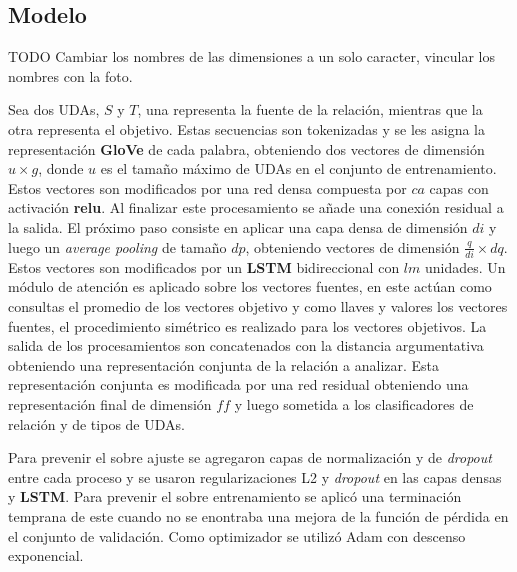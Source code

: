 \subsection{Modelo}

TODO Cambiar los nombres de las dimensiones a un solo caracter, vincular los nombres con la foto.

Sea dos UDAs, $S$ y $T$, una representa la fuente de la relación, mientras que la otra representa
el objetivo. Estas secuencias son tokenizadas y se les asigna la representación \textbf{GloVe} de cada palabra, obteniendo
dos vectores de dimensión $u \times g$, donde $u$ es el tamaño máximo de UDAs en el conjunto de entrenamiento.
Estos vectores son modificados por una red densa compuesta por $ca$ capas con activación \textbf{relu}. 
Al finalizar este procesamiento se añade una conexión residual
a la salida. El próximo paso consiste en aplicar una capa densa de dimensión $di$ y luego un \emph{average pooling}
de tamaño $dp$, obteniendo vectores de dimensión $\frac{q}{di} \times dq$. 
Estos vectores son modificados por un \textbf{LSTM} bidireccional con $lm$ unidades. Un módulo de atención es aplicado 
sobre los vectores fuentes, 
en este actúan como consultas el promedio de los vectores objetivo y como llaves y valores los vectores fuentes,
el procedimiento simétrico es realizado para los vectores objetivos.
La salida de los procesamientos son concatenados con la distancia argumentativa obteniendo una representación 
conjunta de la relación a analizar. Esta representación conjunta es modificada por una red residual obteniendo
una representación final de dimensión $ff$ y luego sometida a los clasificadores de relación y de tipos de UDAs.

Para prevenir el sobre ajuste se agregaron capas de normalización y de \emph{dropout} entre cada proceso y se usaron regularizaciones
L2 y \emph{dropout} en las capas densas y \textbf{LSTM}. Para prevenir el sobre entrenamiento se aplicó una 
terminación temprana de este cuando no se enontraba una mejora de la función de pérdida en el conjunto de validación.
Como optimizador se utilizó Adam con descenso exponencial.

\newpage

